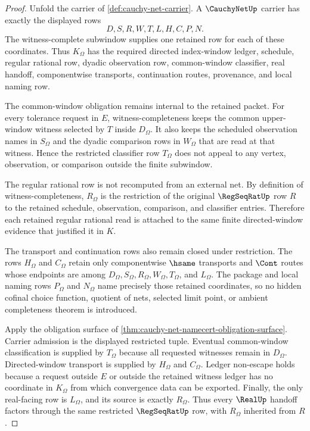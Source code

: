 \begin{proof}
Unfold the carrier of \autoref{def:cauchy-net-carrier}. A $\CauchyNetUp$ carrier has exactly the displayed rows
$$
D,S,R,W,T,L,H,C,P,N.
$$
The witness-complete subwindow supplies one retained row for each of these coordinates. Thus $K_{\Omega}$ has the required directed index-window ledger, schedule, regular rational row, dyadic observation row, common-window classifier, real handoff, componentwise transports, continuation routes, provenance, and local naming row.

The common-window obligation remains internal to the retained packet. For every tolerance request in $E$, witness-completeness keeps the common upper-window witness selected by $T$ inside $D_{\Omega}$. It also keeps the scheduled observation names in $S_{\Omega}$ and the dyadic comparison rows in $W_{\Omega}$ that are read at that witness. Hence the restricted classifier row $T_{\Omega}$ does not appeal to any vertex, observation, or comparison outside the finite subwindow.

The regular rational row is not recomputed from an external net. By definition of witness-completeness, $R_{\Omega}$ is the restriction of the original $\RegSeqRatUp$ row $R$ to the retained schedule, observation, comparison, and classifier entries. Therefore each retained regular rational read is attached to the same finite directed-window evidence that justified it in $K$.

The transport and continuation rows also remain closed under restriction. The rows $H_{\Omega}$ and $C_{\Omega}$ retain only componentwise $\hsame$ transports and $\Cont$ routes whose endpoints are among $D_{\Omega},S_{\Omega},R_{\Omega},W_{\Omega},T_{\Omega}$, and $L_{\Omega}$. The package and local naming rows $P_{\Omega}$ and $N_{\Omega}$ name precisely those retained coordinates, so no hidden cofinal choice function, quotient of nets, selected limit point, or ambient completeness theorem is introduced.

Apply the obligation surface of \autoref{thm:cauchy-net-namecert-obligation-surface}. Carrier admission is the displayed restricted tuple. Eventual common-window classification is supplied by $T_{\Omega}$ because all requested witnesses remain in $D_{\Omega}$. Directed-window transport is supplied by $H_{\Omega}$ and $C_{\Omega}$. Ledger non-escape holds because a request outside $E$ or outside the retained witness ledger has no coordinate in $K_{\Omega}$ from which convergence data can be exported. Finally, the only real-facing row is $L_{\Omega}$, and its source is exactly $R_{\Omega}$. Thus every $\RealUp$ handoff factors through the same restricted $\RegSeqRatUp$ row, with $R_{\Omega}$ inherited from $R$.
\end{proof}

